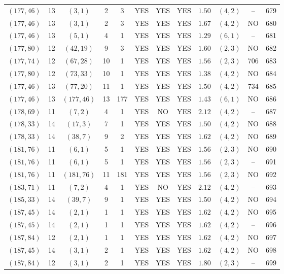 \begin{longtable}{|c|c|c|c|c|c|c|c|c|c|c|c|}
$(177,46)$ & 13 & $(3,1)$ & 2 & 3 & YES & YES & YES & $1.50$ & $(4,2)$ & -- & 679\\
$(177,46)$ & 13 & $(3,1)$ & 2 & 3 & YES & YES & YES & $1.67$ & $(4,2)$ & NO & 680\\
$(177,46)$ & 13 & $(5,1)$ & 4 & 1 & YES & YES & YES & $1.29$ & $(6,1)$ & -- & 681\\
$(177,80)$ & 12 & $(42,19)$ & 9 & 3 & YES & YES & YES & $1.60$ & $(2,3)$ & NO & 682\\
$(177,74)$ & 12 & $(67,28)$ & 10 & 1 & YES & YES & YES & $1.56$ & $(2,3)$ & 706 & 683\\
$(177,80)$ & 12 & $(73,33)$ & 10 & 1 & YES & YES & YES & $1.38$ & $(4,2)$ & NO & 684\\
$(177,46)$ & 13 & $(77,20)$ & 11 & 1 & YES & YES & YES & $1.50$ & $(4,2)$ & 734 & 685\\
$(177,46)$ & 13 & $(177,46)$ & 13 & 177 & YES & YES & YES & $1.43$ & $(6,1)$ & NO & 686\\
$(178,69)$ & 11 & $(7,2)$ & 4 & 1 & YES & NO & YES & $2.12$ & $(4,2)$ & -- & 687\\
$(178,33)$ & 14 & $(17,3)$ & 7 & 1 & YES & YES & YES & $1.50$ & $(4,2)$ & NO & 688\\
$(178,33)$ & 14 & $(38,7)$ & 9 & 2 & YES & YES & YES & $1.62$ & $(4,2)$ & NO & 689\\
$(181,76)$ & 11 & $(6,1)$ & 5 & 1 & YES & YES & YES & $1.56$ & $(2,3)$ & NO & 690\\
$(181,76)$ & 11 & $(6,1)$ & 5 & 1 & YES & YES & YES & $1.56$ & $(2,3)$ & -- & 691\\
$(181,76)$ & 11 & $(181,76)$ & 11 & 181 & YES & YES & YES & $1.56$ & $(2,3)$ & NO & 692\\
$(183,71)$ & 11 & $(7,2)$ & 4 & 1 & YES & NO & YES & $2.12$ & $(4,2)$ & -- & 693\\
$(185,33)$ & 14 & $(39,7)$ & 9 & 1 & YES & YES & YES & $1.50$ & $(4,2)$ & NO & 694\\
$(187,45)$ & 14 & $(2,1)$ & 1 & 1 & YES & YES & YES & $1.62$ & $(4,2)$ & NO & 695\\
$(187,45)$ & 14 & $(2,1)$ & 1 & 1 & YES & YES & YES & $1.62$ & $(4,2)$ & -- & 696\\
$(187,84)$ & 12 & $(2,1)$ & 1 & 1 & YES & YES & YES & $1.62$ & $(4,2)$ & NO & 697\\
$(187,45)$ & 14 & $(3,1)$ & 2 & 1 & YES & YES & YES & $1.62$ & $(4,2)$ & NO & 698\\
$(187,84)$ & 12 & $(3,1)$ & 2 & 1 & YES & YES & YES & $1.80$ & $(2,3)$ & -- & 699\\

\end{longtable}
